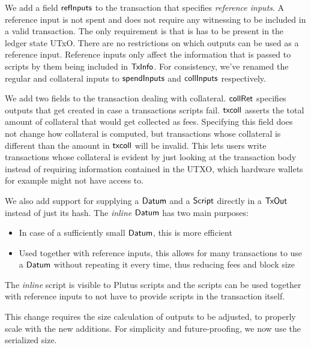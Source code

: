 We add a field $\mathsf{refInputs}$ to the transaction that specifies
\emph{reference inputs}. A reference input is not spent and does not
require any witnessing to be included in a valid transaction. The only
requirement is that is has to be present in the ledger state
UTxO. There are no restrictions on which outputs can be used as a
reference input. Reference inputs only affect the information that is
passed to scripts by them being included in $\mathsf{TxInfo}$.
For consistency, we've renamed the regular and collateral inputs to
$\mathsf{spendInputs}$ and $\mathsf{collInputs}$ respectively.

We add two fields to the transaction dealing with
collateral. $\mathsf{collRet}$ specifies outputs that get created in case
a transactions scripts fail. $\mathsf{txcoll}$ asserts the total amount
of collateral that would get collected as fees. Specifying this field
does not change how collateral is computed, but transactions whose
collateral is different than the amount in $\mathsf{txcoll}$ will be
invalid. This lets users write transactions whose collateral is
evident by just looking at the transaction body instead of requiring
information contained in the UTXO, which hardware wallets for example
might not have access to.

We also add support for supplying a $\mathsf{Datum}$ and a $\mathsf{Script}$ directly in a $\mathsf{TxOut}$
instead of just its hash. The \emph{inline} $\mathsf{Datum}$ has two main purposes:
\begin{itemize}
\item In case of a sufficiently small $\mathsf{Datum}$, this is more efficient
\item Used together with reference inputs, this allows for many
  transactions to use a $\mathsf{Datum}$ without repeating it every time, thus
  reducing fees and block size
\end{itemize}
The \emph{inline} script is visible to Plutus scripts and the scripts
can be used together with reference inputs to not have to provide
scripts in the transaction itself.

This change requires the size calculation of outputs to be adjusted,
to properly scale with the new additions. For simplicity and
future-proofing, we now use the serialized size.
